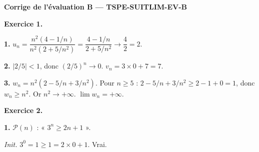 %
%
%
%

\textbf{Corrige de l'évaluation B — TSPE-SUITLIM-EV-B}

\bigskip


\textbf{Exercice 1.}

\textbf{1.} $u_n = \dfrac{n^2(4 - 1/n)}{n^2(2 + 5/n^2)} = \dfrac{4 - 1/n}{2 + 5/n^2} \to \dfrac{4}{2} = \boxed{2}$.

\textbf{2.} $|2/5| < 1$, donc $(2/5)^n \to 0$. $v_n = 3 \times 0 + 7 = \boxed{7}$.

\textbf{3.} $w_n = n^2(2 - 5/n + 3/n^2)$. Pour $n \geq 5$ : $2 - 5/n + 3/n^2 \geq 2 - 1 + 0 = 1$, donc $w_n \geq n^2$. Or $n^2 \to +\infty$. $\boxed{\lim w_n = +\infty}$.

\bigskip


\textbf{Exercice 2.}

\textbf{1.} $\mathcal{P}(n)$ : « $3^n \geq 2n + 1$ ».

\textit{Init.} $3^0 = 1 \geq 1 = 2 \times 0 + 1$. Vrai.

